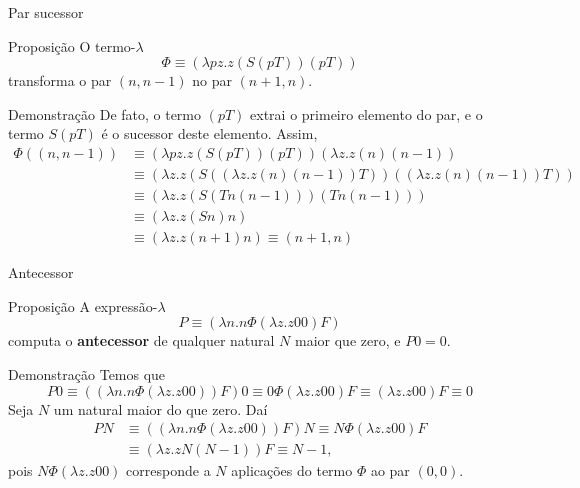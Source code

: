 \begin{frame}[fragile]{Par sucessor}

    \begin{block}{Proposição}
    O termo-$\lambda$
    \[
        \Phi \equiv (\lambda pz.z(S(pT))(pT))
    \]
    transforma o par $(n, n - 1)$ no par $(n + 1, n)$.
    \end{block}

    \begin{block}{Demonstração}
    De fato, o termo $(pT)$ extrai o primeiro elemento do par, e o termo $S(pT)$ é o sucessor
    deste elemento. Assim,
    \begin{align*}
        \Phi ((n, n - 1)) &\equiv  (\lambda pz.z(S(pT))(pT))(\lambda z.z(n)(n-1)) \\
        &\equiv  (\lambda z.z(S((\lambda z.z(n)(n-1))T))((\lambda z.z(n)(n-1))T)) \\
        &\equiv  (\lambda z.z(S(Tn(n-1)))(Tn(n-1))) \\
        &\equiv  (\lambda z.z(Sn)n) \\
        &\equiv  (\lambda z.z(n + 1)n) \equiv (n + 1, n)
    \end{align*}
    \end{block}

\end{frame}

\begin{frame}[fragile]{Antecessor}

    \begin{block}{Proposição}
    A expressão-$\lambda$
    \[
        P \equiv (\lambda n.n\Phi (\lambda z.z00)F)
    \]
    computa o \textbf{antecessor} de qualquer natural $N$ maior que zero, e $P0 = 0$.
    \end{block}

    \begin{block}{Demonstração}
    Temos que
    \[
        P0 \equiv ((\lambda n.n\Phi (\lambda z.z00))F)0 \equiv 0\Phi (\lambda z.z00) F
        \equiv (\lambda z.z00)F \equiv 0
    \]
    Seja $N$ um natural maior do que zero. Daí
    \begin{align*}
        PN &\equiv ((\lambda n.n\Phi (\lambda z.z00))F)N \equiv N\Phi (\lambda z.z00) F \\
        &\equiv (\lambda z.zN(N - 1))F \equiv N - 1,
    \end{align*}
    pois $N\Phi (\lambda z.z00)$ corresponde a $N$ aplicações do termo $\Phi$ ao par $(0, 0)$.
    \end{block}
\end{frame}


